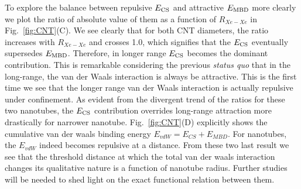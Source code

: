 \documentclass[aps,prl,groupaddress, twocolumn]{revtex4-1}
\begin{document}
To explore the balance between repulsive $E_{\rm CS}$ and attractive $E_{\rm MBD}$ more clearly we plot the ratio of absolute value of them as a function of $R_{Xe-Xe}$ in Fig.~\ref{fig:CNT}(C). We see clearly that for both CNT diameters, the ratio increases with $R_{Xe-Xe}$ and crosses 1.0, which signifies that the $E_{\rm CS}$ eventually supersedes $E_{\rm MBD}$. Therefore, in longer range $E_{\rm CS}$ becomes the dominant contribution. This is remarkable considering the previous \textit{status quo} that in the long-range, the van der Waals interaction is always be attractive. This is the first time we see that the longer range van der Waals interaction is actually repulsive under confinement. As evident from the divergent trend of the ratios for these two nanotubes, the $E_{\rm CS}$ contribution overrides long-range attraction more drastically for narrower nanotube. Fig.~\ref{fig:CNT}(D) explicitly shows the cumulative van der waals binding energy $E_{vdW} = E_{CS} + E_{MBD}$. For nanotubes, the $E_{vdW}$ indeed becomes repulsive at a distance. From these two last result we see that the threshold distance at which the total van der waals interaction changes its qualitative nature is a function of nanotube radius. Further studies will be needed to shed light on the exact functional relation between them. 
\end{document}
